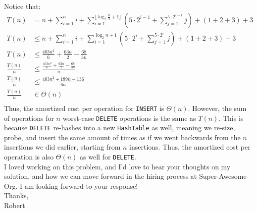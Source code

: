 \documentclass{article}
\begin{document}
\noindent Notice that:
\begin{align*}
    T(n) &= n + \sum_{i=1}^{n}i + \sum_{i=1}^{\lfloor{\log_{2}{\tfrac{n}{5}} + 1\rfloor}}(5\cdot{2^{i-1}} + \sum_{j=1}^{5\cdot{2^{i-1}}}j) + (1 + 2 + 3) + 3 \\ 
    T(n) &\leq n + \sum_{i=1}^{n}i + \sum_{i=1}^{\log_{2}{n} + 1}(5\cdot{2^i} + \sum_{j=1}^{5\cdot{2^i}}{j}) + (1 + 2 + 3) + 3 \\
    T(n) &\leq \tfrac{403n^2}{6} + \tfrac{63n}{2} - \tfrac{68}{3n} \\ 
    \tfrac{T(n)}{n} &\leq \tfrac{\tfrac{403n^2}{6} + \tfrac{63n}{2} - \tfrac{68}{3n}}{n}  \\ 
    \tfrac{T(n)}{n} &\leq \tfrac{403n^2 + 189n - 136}{6n} \tag*{(computed using Wolfram Alpha)} 
    \\
    \tfrac{T(n)}{n} &\in{\Theta(n)} \\ 
\end{align*}
Thus, the amortized cost per operation for \verb|INSERT| is $\Theta(n)$. However, the sum of operations for $n$ worst-case \verb|DELETE| operations is the same as $T(n)$. This is because \verb|DELETE| re-hashes into a new \verb|HashTable| as well, meaning we re-size, probe, and insert the same amount of times as if we went backwards from the $n$ insertions we did earlier, starting from $n$ insertions. Thus, the amortized cost per operation is also $\Theta(n)$ as well for \verb|DELETE|. \\

\noindent I loved working on this problem, and I'd love to hear your thoughts on my solution, and how we can move forward in the hiring process at Super-Awesome-Org. I am looking forward to your response! \\ 

\noindent Thanks, \\ 
Robert
\end{document}
